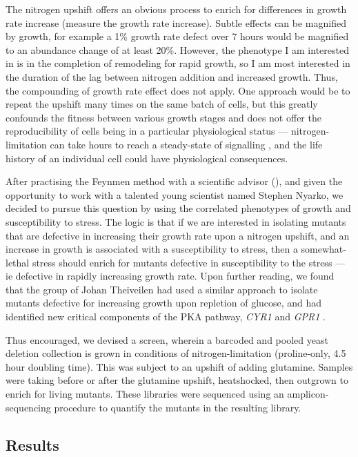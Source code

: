 The nitrogen upshift offers an obvious process to enrich for
differences in growth rate increase (measure the growth rate
increase). Subtle effects can be magnified by growth, for example a
1\% growth rate defect over 7 hours would be magnified to an abundance
change of at least 20\%. However, the phenotype I am interested in is
in the completion of remodeling for rapid growth, so I am most
interested in the duration of the lag between nitrogen addition and
increased growth. Thus, the compounding of growth rate effect does not 
apply. One approach would be to repeat the upshift many times on the
same batch of cells, but this greatly confounds the fitness between 
various growth stages and does not offer the reproducibility of cells
being in a particular physiological status --- nitrogen-limitation can
take hours to reach a steady-state of signalling
\parencite{tate2013five}, and the life history of an individual cell
could have physiological consequences.

After practising the Feynmen method with a scientific advisor
(), and given
the opportunity to work with a talented young scientist named Stephen
Nyarko, we decided to pursue this question by using the correlated
phenotypes of growth and susceptibility to stress.
The logic is that if we are interested in isolating mutants that are
defective in increasing their growth rate upon a nitrogen upshift, and
an increase in growth is associated with a susceptibility to stress,
then a somewhat-lethal stress should enrich for mutants defective in
susceptibility to the stress --- ie defective in rapidly increasing 
growth rate.
Upon further reading, we found that the group of Johan Theiveilen had
used a similar approach to isolate mutants defective for increasing
growth upon repletion of glucose, and had identified new critical
components of the PKA pathway, \textit{CYR1} and \textit{GPR1}
\parencite{vandjick2000}.

Thus encouraged, we devised a screen, wherein a barcoded and pooled 
yeast deletion collection
is grown in conditions of nitrogen-limitation (proline-only, 4.5 hour
doubling time). This was subject to an upshift of adding glutamine.
Samples were taking before or after the glutamine upshift,
heatshocked, then outgrown to enrich for living mutants.
These libraries were sequenced using an amplicon-sequencing procedure
to quantify the mutants in the resulting library.

\subsection{Results}

